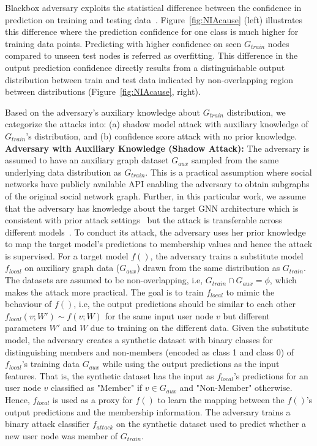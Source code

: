 Blackbox adversary exploits the statistical difference between the confidence in prediction on training and testing data~\cite{membershipinf}. %
Figure~\ref{fig:NIAcause} (left) illustrates this difference where the prediction confidence for one class is much higher for training data points.
Predicting with higher confidence on seen $G_{train}$ nodes compared to unseen test nodes is referred as overfitting.
This difference in the output prediction confidence directly results from a distinguishable output distribution between train and test data indicated by non-overlapping region between distributions (Figure~\ref{fig:NIAcause}, right).


Based on the adversary's auxiliary knowledge about $G_{train}$ distribution, we categorize the attacks into: (a) shadow model attack with auxiliary knowledge of $G_{train}$'s distribution, and (b) confidence score attack with no prior knowledge.\\

\noindent\textbf{Adversary with Auxiliary Knowledge (Shadow Attack):} The adversary is assumed to have an auxiliary graph dataset $G_{aux}$ sampled from the same underlying data distribution as $G_{train}$.
This is a practical assumption where social networks have publicly available API enabling the adversary to obtain subgraphs of the original social network graph.
Further, in this particular work, we assume that the adversary has knowledge about the target GNN architecture which is consistent with prior attack settings~\cite{membershipinf,attributeinf,attributeinf2,logan} but the attack is transferable across different models~\cite{ndss19salem}. 
To conduct its attack, the adversary uses her prior knowledge to map the target model's predictions to membership values and hence the attack is supervised.
For a target model $f()$, the adversary trains a substitute model $f_{local}$ on auxiliary graph data ($G_{aux}$) drawn from the same distribution as $G_{train}$.
The datasets are assumed to be non-overlapping, i.e, $G_{train} \cap G_{aux} = \phi$, which makes the attack more practical.
The goal is to train $f_{local}$ to mimic the behaviour of $f()$, i.e, the output predictions should be similar to each other $f_{local}(v;W') \sim f(v;W)$ for the same input user node $v$ but different parameters $W'$ and $W$ due to training on the different data.
Given the substitute model, the adversary creates a synthetic dataset with binary classes for distinguishing members and non-members (encoded as class 1 and class 0) of $f_{local}$'s training data $G_{aux}$ while using the output predictions as the input features.
That is, the synthetic dataset has the input as $f_{local}$'s predictions for an user node $v$ classified as "Member" if $v \in G_{aux}$ and "Non-Member" otherwise.
Hence, $f_{local}$ is used as a proxy for $f()$ to learn the mapping between the $f()$'s output predictions and the membership information.
The adversary trains a binary attack classifier $f_{attack}$ on the synthetic dataset used to predict whether a new user node was member of $G_{train}$.\\


